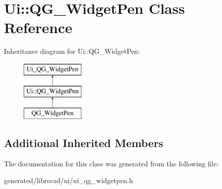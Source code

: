 \hypertarget{classUi_1_1QG__WidgetPen}{\section{Ui\-:\-:Q\-G\-\_\-\-Widget\-Pen Class Reference}
\label{classUi_1_1QG__WidgetPen}
}
Inheritance diagram for Ui\-:\-:Q\-G\-\_\-\-Widget\-Pen\-:\begin{figure}[H]
\begin{center}
\leavevmode
\includegraphics[height=3.000000cm]{classUi_1_1QG__WidgetPen}
\end{center}
\end{figure}
\subsection*{Additional Inherited Members}


The documentation for this class was generated from the following file\-:\begin{DoxyCompactItemize}
\item 
generated/librecad/ui/ui\-\_\-qg\-\_\-widgetpen.\-h\end{DoxyCompactItemize}
